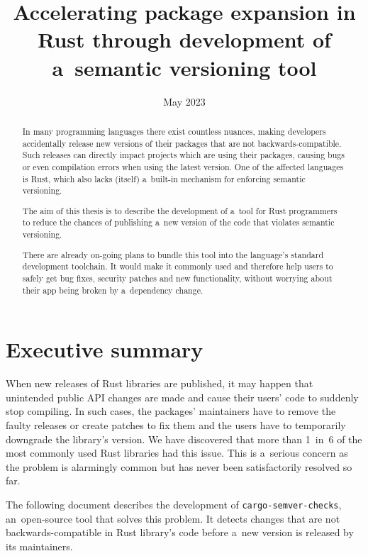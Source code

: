 \documentclass[licencjacka,en]{pracamgr}
\date{May 2023}
\title{Accelerating package expansion in Rust through development of a~semantic versioning tool}
\begin{document}
\maketitle

\begin{abstract}
In many programming languages there exist countless nuances, making developers accidentally release
new versions of their packages that are not backwards-compatible. Such releases can directly impact
projects which are using their packages, causing bugs or even compilation errors when using the
latest version. One of the affected languages is Rust, which also lacks (itself) a~built-in
mechanism for enforcing semantic versioning.

The aim of this thesis is to describe the development of a~tool for Rust programmers to reduce the
chances of publishing a~new version of the code that violates semantic versioning.

There are already on-going plans to bundle this tool into the language's standard
development toolchain. It would make it commonly used and therefore help users to safely get
bug fixes, security patches and new functionality, without worrying about their app being broken
by a~dependency change.
\end{abstract}

\tableofcontents



\chapter*{Executive summary}

When new releases of Rust libraries are published, it may happen that unintended public API changes
are made and cause their users' code to suddenly stop compiling. In such cases, the packages'
maintainers have to remove the faulty releases or create patches to fix them and the users
have to temporarily downgrade the library's version. We have discovered that more than 1~in~6
of the most commonly used Rust libraries had this issue. This is a~serious concern as the problem
is alarmingly common but has never been satisfactorily resolved so far.

The following document describes the development of \texttt{cargo-semver-checks}, an~open-source
tool that solves this problem. It detects changes that are
not backwards-compatible in Rust library's code before a~new version is released by its maintainers.
\end{document}
